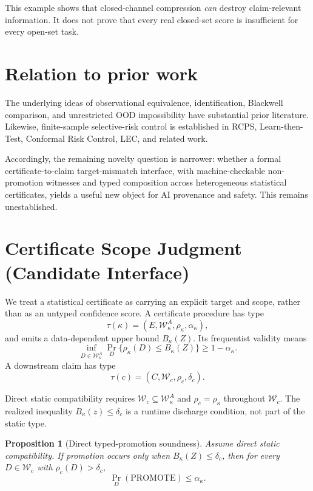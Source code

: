 \documentclass[11pt]{article}
\newtheorem{proposition}{Proposition}
\begin{document}
This example shows that closed-channel compression \emph{can} destroy
claim-relevant information. It does not prove that every real closed-set score
is insufficient for every open-set task.

\section{Relation to prior work}

The underlying ideas of observational equivalence, identification, Blackwell
comparison, and unrestricted OOD impossibility have substantial prior
literature. Likewise, finite-sample selective-risk control is established in
RCPS, Learn-then-Test, Conformal Risk Control, LEC, and related work.

Accordingly, the remaining novelty question is narrower: whether a formal
certificate-to-claim target-mismatch interface, with machine-checkable
non-promotion witnesses and typed composition across heterogeneous statistical
certificates, yields a useful new object for AI provenance and safety. This
remains unestablished.

\section{Certificate Scope Judgment (Candidate Interface)}
\label{sec:csj}

We treat a statistical certificate as carrying an explicit target and scope,
rather than as an untyped confidence score. A certificate procedure has type
\[
\tau(\kappa)
=
(E,\mathcal W_\kappa^A,\rho_\kappa,\alpha_\kappa),
\]
and emits a data-dependent upper bound $B_\kappa(Z)$. Its frequentist
validity means
\[
\inf_{D\in\mathcal W_\kappa^A}
\Pr_D\{\rho_\kappa(D)\le B_\kappa(Z)\}
\ge1-\alpha_\kappa.
\]
A downstream claim has type
\[
\tau(c)=(C,\mathcal W_c,\rho_c,\delta_c).
\]

Direct static compatibility requires
$\mathcal W_c\subseteq\mathcal W_\kappa^A$ and
$\rho_c=\rho_\kappa$ throughout $\mathcal W_c$. The realized inequality
$B_\kappa(z)\le\delta_c$ is a runtime discharge condition, not part of the
static type.

\begin{proposition}[Direct typed-promotion soundness]
Assume direct static compatibility. If promotion occurs only when
$B_\kappa(Z)\le\delta_c$, then for every
$D\in\mathcal W_c$ with $\rho_c(D)>\delta_c$,
\[
\Pr_D(\mathrm{PROMOTE})\le\alpha_\kappa.
\]
\end{proposition}
\end{document}
